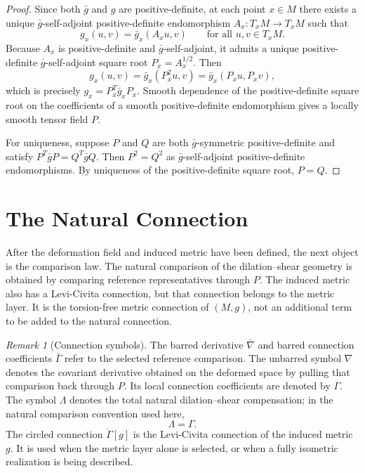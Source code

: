 \documentclass[12pt]{amsart}
\theoremstyle{definition}
\theoremstyle{remark}
\newtheorem{remark}[theorem]{Remark}
\begin{document}
\begin{proof}
Since both $\bar g$ and $g$ are positive-definite, at each point $x\in M$ there exists a unique $\bar g$-self-adjoint positive-definite endomorphism $A_x:T_xM\to T_xM$ such that
\[
 g_x(u,v)=\bar g_x(A_xu,v)
 \qquad\text{for all }u,v\in T_xM .
\]
Because $A_x$ is positive-definite and $\bar g$-self-adjoint, it admits a unique positive-definite $\bar g$-self-adjoint square root $P_x=A_x^{1/2}$.  Then
\[
 g_x(u,v)=\bar g_x(P_x^2u,v)=\bar g_x(P_xu,P_xv),
\]
which is precisely $g_x=P_x^T\bar g_xP_x$.  Smooth dependence of the positive-definite square root on the coefficients of a smooth positive-definite endomorphism gives a locally smooth tensor field $P$.

For uniqueness, suppose $P$ and $Q$ are both $\bar g$-symmetric positive-definite and satisfy $P^T\bar gP=Q^T\bar gQ$.  Then $P^2=Q^2$ as $\bar g$-self-adjoint positive-definite endomorphisms.  By uniqueness of the positive-definite square root, $P=Q$.
\end{proof}



\section{The Natural Connection}\label{sec:connections}

After the deformation field and induced metric have been defined, the next object is the comparison law.  The natural comparison of the dilation--shear geometry is obtained by comparing reference representatives through \(P\).  The induced metric also has a Levi-Civita connection, but that connection belongs to the metric layer.  It is the torsion-free metric connection of \((M,g)\), not an additional term to be added to the natural connection.

\begin{remark}[Connection symbols]\label{rem:connection_symbols}
The barred derivative \(\bar\nabla\) and barred connection coefficients \(\bar\Gamma\) refer to the selected reference comparison.  The unbarred symbol \(\nabla\) denotes the covariant derivative obtained on the deformed space by pulling that comparison back through \(P\).  Its local connection coefficients are denoted by \(\Gamma\).  The symbol \(\Lambda\) denotes the total natural dilation--shear compensation; in the natural comparison convention used here,
\[
 \Lambda=\Gamma .
\]
The circled connection \(\mathring\Gamma[g]\) is the Levi-Civita connection of the induced metric \(g\).  It is used when the metric layer alone is selected, or when a fully isometric realization is being described.
\end{remark}
\end{document}
